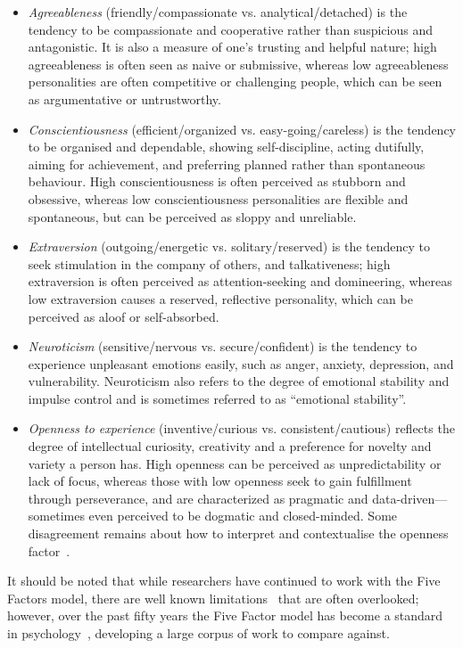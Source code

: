 \documentclass[graybox]{svmult}
\begin{document}
\begin{itemize}
\item {\emph{Agreeableness}} (friendly/compassionate
  vs. analytical/detached) is the tendency to be compassionate and
  cooperative rather than suspicious and antagonistic. It is also a
  measure of one's trusting and helpful nature; high agreeableness is
  often seen as naive or submissive, whereas low agreeableness
  personalities are often competitive or challenging people, which can
  be seen as argumentative or untrustworthy.
\item {\emph{Conscientiousness}} (efficient/organized
  vs. easy-going/careless) is the tendency to be organised and
  dependable, showing self-discipline, acting dutifully, aiming for
  achievement, and preferring planned rather than spontaneous
  behaviour. High conscientiousness is often perceived as stubborn and
  obsessive, whereas low conscientiousness personalities are flexible
  and spontaneous, but can be perceived as sloppy and unreliable.
\item {\emph{Extraversion}} (outgoing/energetic vs. solitary/reserved)
  is the tendency to seek stimulation in the company of others, and
  talkativeness; high extraversion is often perceived as
  attention-seeking and domineering, whereas low extraversion causes a
  reserved, reflective personality, which can be perceived as aloof or
  self-absorbed.
\item {\emph{Neuroticism}} (sensitive/nervous vs. secure/confident) is
  the tendency to experience unpleasant emotions easily, such as
  anger, anxiety, depression, and vulnerability. Neuroticism also
  refers to the degree of emotional stability and impulse control and
  is sometimes referred to as ``emotional stability''. 
\item {\emph{Openness to experience}} (inventive/curious
  vs. consistent/cautious) reflects the degree of intellectual
  curiosity, creativity and a preference for novelty and variety a
  person has. High openness can be perceived as unpredictability or
  lack of focus, whereas those with low openness seek to gain
  fulfillment through perseverance, and are characterized as pragmatic
  and data-driven—sometimes even perceived to be dogmatic and
  closed-minded. Some disagreement remains about how to interpret and
  contextualise the openness factor~\citep{peabody+goldberg:1989}.
\end{itemize}

It should be noted that while researchers have continued to work with
the Five Factors model, there are well known
limitations~\cite{eysenck:1992,paunonen+jackson:2000,block:2010} that
are often overlooked; however, over the past fifty years the Five
Factor model has become a standard in
psychology~\cite{mairesse-et-al:2007}, developing a large corpus of
work to compare against.
\end{document}
